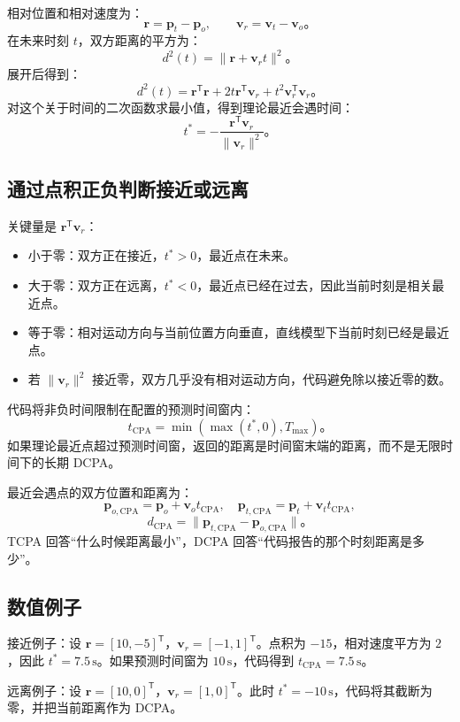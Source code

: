 \documentclass[UTF8,11pt,a4paper]{ctexart}
\begin{document}
相对位置和相对速度为：
\[
\bm{r}=\bm{p}_t-\bm{p}_o,\qquad \bm{v}_r=\bm{v}_t-\bm{v}_o。
\]
在未来时刻 \(t\)，双方距离的平方为：
\[
d^2(t)=\|\bm{r}+\bm{v}_r t\|^2。
\]
展开后得到：
\[
d^2(t)=\bm{r}^{\mathsf T}\bm{r}+2t\bm{r}^{\mathsf T}\bm{v}_r+t^2\bm{v}_r^{\mathsf T}\bm{v}_r。
\]
对这个关于时间的二次函数求最小值，得到理论最近会遇时间：
\[
t^*=-\frac{\bm{r}^{\mathsf T}\bm{v}_r}{\|\bm{v}_r\|^2}。
\]
\subsection{通过点积正负判断接近或远离}
关键量是 \(\bm{r}^{\mathsf T}\bm{v}_r\)：
\begin{itemize}
  \item 小于零：双方正在接近，\(t^*>0\)，最近点在未来。
  \item 大于零：双方正在远离，\(t^*<0\)，最近点已经在过去，因此当前时刻是相关最近点。
  \item 等于零：相对运动方向与当前位置方向垂直，直线模型下当前时刻已经是最近点。
  \item 若 \(\|\bm{v}_r\|^2\) 接近零，双方几乎没有相对运动方向，代码避免除以接近零的数。
\end{itemize}

代码将非负时间限制在配置的预测时间窗内：
\[
t_{\mathrm{CPA}}=\min\left(\max(t^*,0),T_{\max}\right)。
\]
如果理论最近点超过预测时间窗，返回的距离是时间窗末端的距离，而不是无限时间下的长期 DCPA。

最近会遇点的双方位置和距离为：
\[
\bm{p}_{o,\mathrm{CPA}}=\bm{p}_o+\bm{v}_o t_{\mathrm{CPA}},
\quad
\bm{p}_{t,\mathrm{CPA}}=\bm{p}_t+\bm{v}_t t_{\mathrm{CPA}},
\]
\[
d_{\mathrm{CPA}}=\|\bm{p}_{t,\mathrm{CPA}}-\bm{p}_{o,\mathrm{CPA}}\|。
\]
TCPA 回答“什么时候距离最小”，DCPA 回答“代码报告的那个时刻距离是多少”。

\subsection{数值例子}
接近例子：设 \(\bm{r}=[10,-5]^{\mathsf T}\)，\(\bm{v}_r=[-1,1]^{\mathsf T}\)。点积为 \(-15\)，相对速度平方为 \(2\)，因此 \(t^*=7.5\,\mathrm{s}\)。如果预测时间窗为 \(10\,\mathrm{s}\)，代码得到 \(t_{\mathrm{CPA}}=7.5\,\mathrm{s}\)。

远离例子：设 \(\bm{r}=[10,0]^{\mathsf T}\)，\(\bm{v}_r=[1,0]^{\mathsf T}\)。此时 \(t^*=-10\,\mathrm{s}\)，代码将其截断为零，并把当前距离作为 DCPA。



\end{document}

